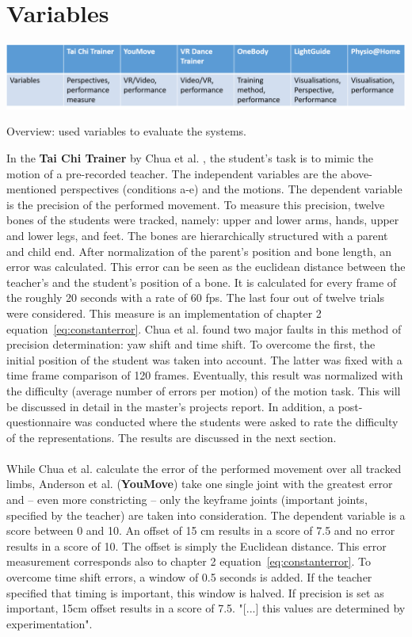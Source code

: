 \section{Variables}
\begin{table}[h]
	\centering
	\includegraphics[width=1.0\textwidth]{img/tbl4.png}
	\caption{Overview: used variables to evaluate the systems.}
	\label{fig:tbl4}
\end{table}
In the \textbf{Tai Chi Trainer} by Chua et al. \cite{Chua2003}, the student's task is to mimic the motion of a pre-recorded teacher. The independent variables are the above-mentioned perspectives (conditions a-e) and the motions. The dependent variable is the precision of the performed movement. To measure this precision, twelve bones of the students were tracked, namely: upper and lower arms, hands, upper and lower legs, and feet. The bones are hierarchically structured with a parent and child end. After normalization of the parent's position and bone length, an error was calculated. This error can be seen as the euclidean distance between the teacher's and the student's position of a bone. It is calculated for every frame of the roughly 20 seconds with a rate of 60 fps. The last four out of twelve trials were considered. This measure is an implementation of chapter 2 equation~\ref{eq:constanterror}.
Chua et al. found two major faults in this method of precision determination: yaw shift and time shift. To overcome the first, the initial position of the student was taken into account. The latter was fixed with a time frame comparison of 120 frames. Eventually, this result was normalized with the difficulty (average number of errors per motion) of the motion task. This will be discussed in detail in the master's projects report. In addition, a post-questionnaire was conducted where the students were asked to rate the difficulty of the representations. The results are discussed in the next section.\\ \\
While Chua et al. calculate the error of the performed movement over all tracked limbs, Anderson et al. (\textbf{YouMove}) take one single joint with the greatest error and \--- even more constricting \--- only the keyframe joints (important joints, specified by the teacher) are taken into consideration. The dependent variable is a score between 0 and 10. An offset of 15 cm results in a score of 7.5 and no error results in a score of 10. The offset is simply the Euclidean distance. This error measurement corresponds also to chapter 2 equation~\ref{eq:constanterror}. To overcome time shift errors, a window of 0.5 seconds is added. If the teacher specified that timing is important, this window is halved. If precision is set as important, 15cm offset results in a score of 7.5. "[...] this values are determined by experimentation"\cite{Anderson2013a}.\\ \\
